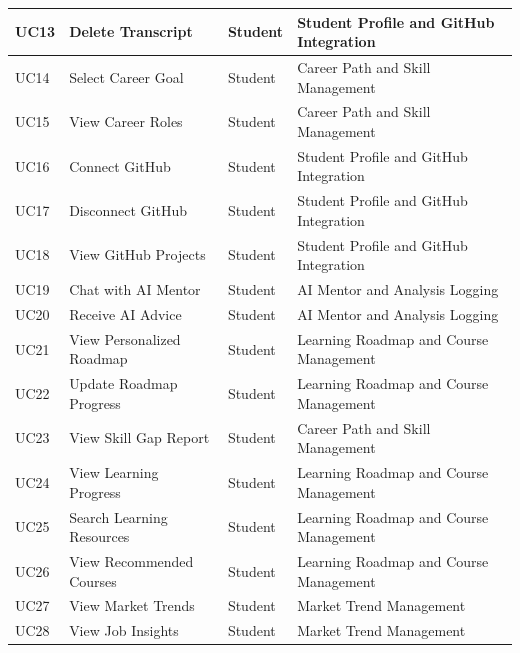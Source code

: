 \begin{longtable}{|>{\centering\arraybackslash}m{0.8cm}|>{\raggedright\arraybackslash}m{3.0cm}|>{\raggedright\arraybackslash}m{2.4cm}|>{\raggedright\arraybackslash}m{4.8cm}|}
UC13 & Delete Transcript & Student & Student Profile and GitHub Integration \\
\hline

UC14 & Select Career Goal & Student & Career Path and Skill Management \\
\hline

UC15 & View Career Roles & Student & Career Path and Skill Management \\
\hline

UC16 & Connect GitHub & Student & Student Profile and GitHub Integration \\
\hline

UC17 & Disconnect GitHub & Student & Student Profile and GitHub Integration \\
\hline

UC18 & View GitHub Projects & Student & Student Profile and GitHub Integration \\
\hline

UC19 & Chat with AI Mentor & Student & AI Mentor and Analysis Logging \\
\hline

UC20 & Receive AI Advice & Student & AI Mentor and Analysis Logging \\
\hline

UC21 & View Personalized Roadmap & Student & Learning Roadmap and Course Management \\
\hline

UC22 & Update Roadmap Progress & Student & Learning Roadmap and Course Management \\
\hline

UC23 & View Skill Gap Report & Student & Career Path and Skill Management \\
\hline

UC24 & View Learning Progress & Student & Learning Roadmap and Course Management \\
\hline

UC25 & Search Learning Resources & Student & Learning Roadmap and Course Management \\
\hline

UC26 & View Recommended Courses & Student & Learning Roadmap and Course Management \\
\hline

UC27 & View Market Trends & Student & Market Trend Management \\
\hline

UC28 & View Job Insights & Student & Market Trend Management \\
\hline


\end{longtable}
